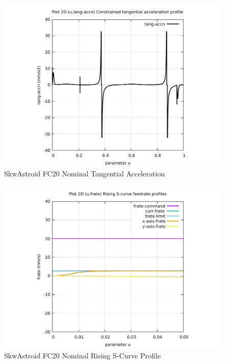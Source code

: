 \begin{figure}
	\caption     {SkwAstroid FC20 Nominal Tangential Acceleration}
	\label{14-img-SkwAstroid-FC20-Nominal-Tangential-Acceleration.pdf}
	\includegraphics[width=1.00\textwidth]{Chap4/appendix/app-SkwAstroid/plots/14-img-SkwAstroid-FC20-Nominal-Tangential-Acceleration.pdf}
\end{figure}

\clearpage
\pagebreak

\begin{figure}
	\caption     {SkwAstroid FC20 Nominal Rising S-Curve Profile}
	\label{15-img-SkwAstroid-FC20-Nominal-Rising-S-Curve-Profile.pdf}
	\includegraphics[width=1.00\textwidth]{Chap4/appendix/app-SkwAstroid/plots/15-img-SkwAstroid-FC20-Nominal-Rising-S-Curve-Profile.pdf}
\end{figure}


